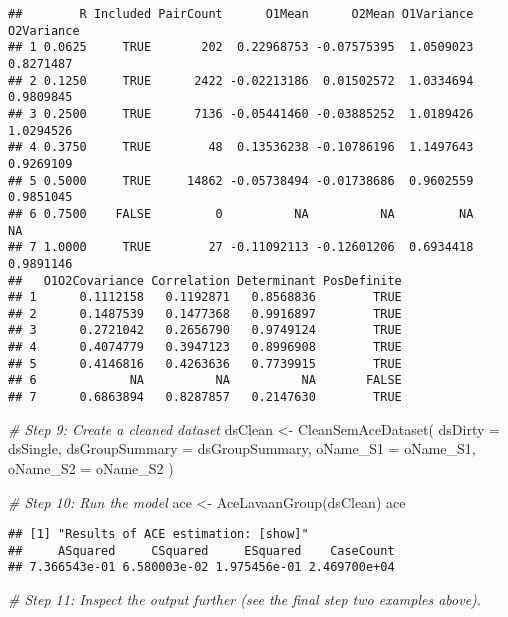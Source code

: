 \documentclass[smallextended]{svjour3}       %
\newenvironment{Shaded}{\begin{snugshade}}{\end{snugshade}}
\newcommand{\AttributeTok}[1]{\textcolor[rgb]{0.77,0.63,0.00}{#1}}
\newcommand{\CommentTok}[1]{\textcolor[rgb]{0.56,0.35,0.01}{\textit{#1}}}
\newcommand{\FunctionTok}[1]{\textcolor[rgb]{0.00,0.00,0.00}{#1}}
\newcommand{\NormalTok}[1]{#1}
\newcommand{\OtherTok}[1]{\textcolor[rgb]{0.56,0.35,0.01}{#1}}
\begin{document}
\begin{verbatim}
##        R Included PairCount      O1Mean      O2Mean O1Variance O2Variance
## 1 0.0625     TRUE       202  0.22968753 -0.07575395  1.0509023  0.8271487
## 2 0.1250     TRUE      2422 -0.02213186  0.01502572  1.0334694  0.9809845
## 3 0.2500     TRUE      7136 -0.05441460 -0.03885252  1.0189426  1.0294526
## 4 0.3750     TRUE        48  0.13536238 -0.10786196  1.1497643  0.9269109
## 5 0.5000     TRUE     14862 -0.05738494 -0.01738686  0.9602559  0.9851045
## 6 0.7500    FALSE         0          NA          NA         NA         NA
## 7 1.0000     TRUE        27 -0.11092113 -0.12601206  0.6934418  0.9891146
##   O1O2Covariance Correlation Determinant PosDefinite
## 1      0.1112158   0.1192871   0.8568836        TRUE
## 2      0.1487539   0.1477368   0.9916897        TRUE
## 3      0.2721042   0.2656790   0.9749124        TRUE
## 4      0.4074779   0.3947123   0.8996908        TRUE
## 5      0.4146816   0.4263636   0.7739915        TRUE
## 6             NA          NA          NA       FALSE
## 7      0.6863894   0.8287857   0.2147630        TRUE
\end{verbatim}

\begin{Shaded}
\begin{Highlighting}[]
\CommentTok{\# Step 9: Create a cleaned dataset}
\NormalTok{dsClean }\OtherTok{\textless{}{-}}
  \FunctionTok{CleanSemAceDataset}\NormalTok{(}
    \AttributeTok{dsDirty         =}\NormalTok{ dsSingle,}
    \AttributeTok{dsGroupSummary  =}\NormalTok{ dsGroupSummary,}
    \AttributeTok{oName\_S1        =}\NormalTok{ oName\_S1,}
    \AttributeTok{oName\_S2        =}\NormalTok{ oName\_S2}
\NormalTok{  )}

\CommentTok{\# Step 10: Run the model}
\NormalTok{ace }\OtherTok{\textless{}{-}} \FunctionTok{AceLavaanGroup}\NormalTok{(dsClean)}
\NormalTok{ace}
\end{Highlighting}
\end{Shaded}

\begin{verbatim}
## [1] "Results of ACE estimation: [show]"
##     ASquared     CSquared     ESquared    CaseCount 
## 7.366543e-01 6.580003e-02 1.975456e-01 2.469700e+04
\end{verbatim}

\begin{Shaded}
\begin{Highlighting}[]
\CommentTok{\# Step 11: Inspect the output further (see the final step two examples above).}
\end{Highlighting}
\end{Shaded}
\end{document}
